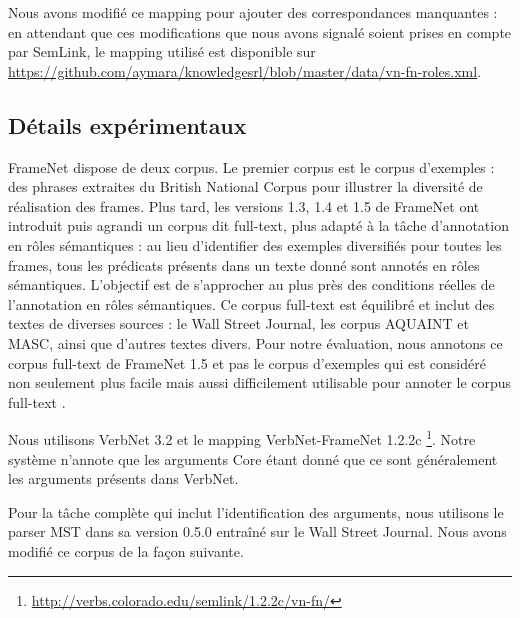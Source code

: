Nous avons modifié ce mapping pour ajouter des correspondances manquantes : en
attendant que ces modifications que nous avons signalé soient prises en compte
par SemLink, le mapping utilisé est disponible sur
\url{https://github.com/aymara/knowledgesrl/blob/master/data/vn-fn-roles.xml}.


\subsection{Détails expérimentaux}
\label{subsec:details_exp}

FrameNet dispose de deux corpus. Le premier corpus est le corpus d'exemples :
des phrases extraites du British National Corpus pour illustrer la diversité de
réalisation des frames. Plus tard, les versions 1.3, 1.4 et 1.5 de FrameNet ont
introduit puis agrandi un corpus dit full-text, plus adapté à la tâche
d'annotation en rôles sémantiques : au lieu d'identifier des exemples
diversifiés pour toutes les frames, tous les prédicats présents dans un texte
donné sont annotés en rôles sémantiques. L'objectif est de s'approcher au plus
près des conditions réelles de l'annotation en rôles sémantiques. Ce corpus
full-text est équilibré et inclut des textes de diverses sources : le Wall
Street Journal, les corpus AQUAINT et MASC, ainsi que d'autres textes divers.
Pour notre évaluation, nous annotons ce corpus full-text de FrameNet 1.5 et pas
le corpus d'exemples qui est considéré non seulement plus facile mais aussi
difficilement utilisable pour annoter le corpus full-text
\citep[section~2.1]{das2010probabilistic}. 

Nous utilisons VerbNet 3.2 et le mapping VerbNet-FrameNet 1.2.2c
\footnote{\url{http://verbs.colorado.edu/semlink/1.2.2c/vn-fn/}}. Notre système
n'annote que les arguments Core étant donné que ce sont généralement les
arguments présents dans VerbNet.


Pour la tâche complète qui inclut l'identification des arguments, nous
utilisons le parser MST dans sa version 0.5.0 \citep{mcdonald2006multilingual}
entraîné sur le Wall Street Journal. Nous avons modifié ce corpus de la façon
suivante.

